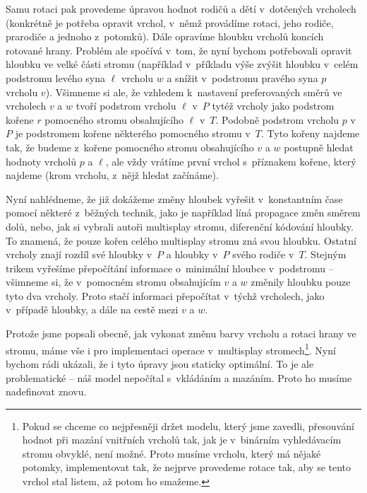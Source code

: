 Samu rotaci pak provedeme úpravou hodnot rodičů a dětí v~dotčených vrcholech
(konkrétně je potřeba opravit vrchol, v~němž provádíme rotaci, jeho rodiče,
prarodiče a jednoho z~potomků). Dále opravíme hloubku vrcholů koncích rotované hrany. Problém ale spočívá v~tom, že nyní bychom
potřebovali opravit hloubku ve velké části stromu (například v~příkladu výše
zvýšit hloubku v~celém podstromu levého syna $\ell$ vrcholu $w$ a snížit
v~podstromu pravého syna $p$ vrcholu $v$). Všimneme si ale, že vzhledem
k~nastavení preferovaných směrů ve vrcholech $v$ a $w$ tvoří podstrom vrcholu
$\ell$ v~$P$ tytéž vrcholy jako podstrom kořene $r$ pomocného stromu
obsahujícího $\ell$ v~$T$. Podobně podstrom vrcholu $p$ v~$P$ je podstromem
kořene některého pomocného stromu v~$T$. Tyto kořeny najdeme tak, že budeme
z~kořene pomocného stromu obsahujícího $v$ a $w$ postupně hledat hodnoty
vrcholů $p$ a $\ell$, ale vždy vrátíme první vrchol s~příznakem kořene, který
najdeme (krom vrcholu, z~nějž hledat začínáme).

Nyní nahlédneme, že již dokážeme změny hloubek vyřešit v~konstantním čase pomocí některé
z~běžných technik, jako je například líná propagace změn směrem dolů, nebo, jak si
vybrali autoři multisplay stromu, diferenční kódování hloubky. To znamená, že
pouze kořen celého multisplay stromu zná svou hloubku. Ostatní vrcholy znají
rozdíl své hloubky v~$P$ a hloubky v~$P$ svého rodiče v~$T$. Stejným trikem
vyřešíme přepočítání informace o~minimální hloubce v~podstromu -- všimneme si, že
v~pomocném stromu obsahujícím $v$ a $w$ změnily hloubku pouze tyto dva vrcholy.
Proto stačí informaci přepočítat v~týchž vrcholech, jako v~případě hloubky, a
dále na cestě mezi $v$ a $w$.

Protože jsme popsali obecně, jak vykonat změnu barvy vrcholu a rotaci hrany ve
stromu, máme vše i pro implementaci operace  v~multisplay
stromech\footnote{Pokud se chceme co nejpřesněji držet modelu, který jsme
zavedli, přesouvání hodnot při mazání vnitřních vrcholů tak, jak je v~binárním
vyhledávacím stromu obvyklé, není možné. Proto musíme  vrcholu,
který má nějaké potomky, implementovat tak, že nejprve provedeme rotace tak,
aby se tento vrchol stal listem, až potom ho smažeme.}. Nyní bychom rádi ukázali,
že i tyto úpravy jsou staticky optimální. To je ale problematické -- náš model
nepočítal s~vkládáním a mazáním. Proto ho musíme nadefinovat znovu.


